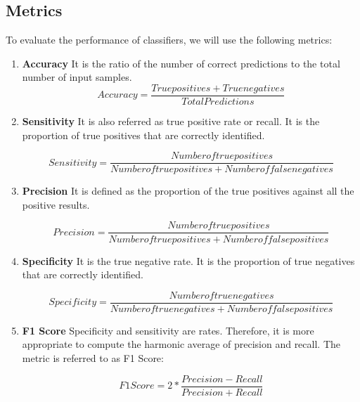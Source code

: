 \documentclass[]{article}
\begin{document}
\subsection{Metrics}
\label{sec:metrics}

To evaluate the performance of classifiers, we will use the following
metrics:

\begin{enumerate}
\item \textbf{Accuracy}
It is the ratio of the number of correct predictions to the total number of input samples.
\begin{equation}
Accuracy = \frac{True positives + True negatives} {Total Predictions}
\end{equation}

\item \textbf{Sensitivity}
It is also referred as true positive rate or recall. It is the proportion of true positives that are correctly identified.

\begin{equation}
Sensitivity = \frac{Number of true positives} {Number of true positives + Number of false negatives}
\end{equation}

\item \textbf{Precision}
It is defined as the proportion of the true positives against all the positive
results.

\begin{equation}
Precision = \frac{Number of true positives} {Number of true positives + Number of false positives}
\end{equation}

\item \textbf{Specificity}
It is the true negative rate. It is the proportion of true negatives that are
correctly identified.

\begin{equation}
Specificity = \frac{Number of true negatives} {Number of true negatives + Number of false positives}
\end{equation}

\item \textbf{F1 Score}
Specificity and sensitivity are rates. Therefore, it is more appropriate to compute the harmonic average of precision and recall. The metric is referred to as F1 Score:

\begin{equation}
F1 Score = 2 * \frac{Precision - Recall} {Precision + Recall}
\end{equation}

\end{enumerate}
\end{document}
